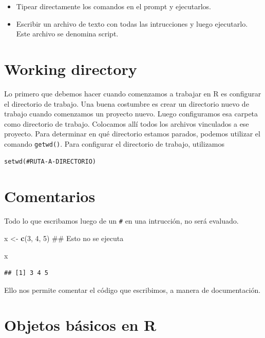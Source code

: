 \documentclass[spanish,]{book}
\newenvironment{Shaded}{\begin{snugshade}}{\end{snugshade}}
\newcommand{\KeywordTok}[1]{\textcolor[rgb]{0.13,0.29,0.53}{\textbf{#1}}}
\newcommand{\DecValTok}[1]{\textcolor[rgb]{0.00,0.00,0.81}{#1}}
\newcommand{\StringTok}[1]{\textcolor[rgb]{0.31,0.60,0.02}{#1}}
\newcommand{\NormalTok}[1]{#1}
\providecommand{\tightlist}{%
  \setlength{\itemsep}{0pt}\setlength{\parskip}{0pt}}
\begin{document}
\begin{itemize}
\tightlist
\item
  Tipear directamente los comandos en el prompt y ejecutarlos.
\item
  Escribir un archivo de texto con todas las intrucciones y luego
  ejecutarlo. Este archivo se denomina script.
\end{itemize}

\section{Working directory}\label{working-directory}

Lo primero que debemos hacer cuando comenzamos a trabajar en R es
configurar el directorio de trabajo. Una buena costumbre es crear un
directorio nuevo de trabajo cuando comenzamos un proyecto nuevo. Luego
configuramos esa carpeta como directorio de trabajo. Colocamos allí
todos los archivos vinculados a ese proyecto. Para determinar en qué
directorio estamos parados, podemos utilizar el comando
\texttt{getwd()}. Para configurar el directorio de trabajo, utilizamos

\begin{verbatim}
setwd(#RUTA-A-DIRECTORIO)
\end{verbatim}

\section{Comentarios}\label{comentarios}

Todo lo que escribamos luego de un \texttt{\#} en una intrucción, no
será evaluado.

\begin{Shaded}
\begin{Highlighting}[]
\NormalTok{x <-}\StringTok{ }\KeywordTok{c}\NormalTok{(}\DecValTok{3}\NormalTok{, }\DecValTok{4}\NormalTok{, }\DecValTok{5}\NormalTok{)}
\NormalTok{## Esto no se ejecuta}

\NormalTok{x}
\end{Highlighting}
\end{Shaded}

\begin{verbatim}
## [1] 3 4 5
\end{verbatim}

Ello nos permite comentar el código que escribimos, a manera de
documentación.

\section{Objetos básicos en R}\label{objetos-basicos-en-r}
\end{document}
